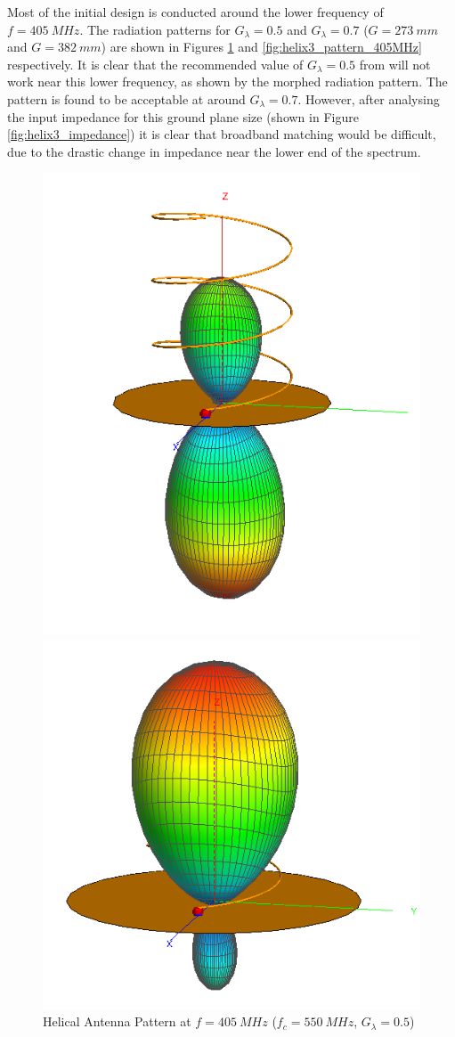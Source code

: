 Most of the initial design is conducted around the lower frequency of $f = \SI{405}{MHz}$. The radiation patterns for $G_\lambda = 0.5$ and $G_\lambda = 0.7$ ($G = \SI{273}{mm}$ and $G = \SI{382}{mm}$) are shown in Figures \ref{fig:helix2_pattern_405MHz} and \ref{fig:helix3_pattern_405MHz} respectively. It is clear that the recommended value of $G_\lambda = 0.5$ from \cite{textbook-antennaTheoryAnalysisDesign} will not work near this lower frequency, as shown by the morphed radiation pattern. The pattern is found to be acceptable at around $G_\lambda = 0.7$. However, after analysing the input impedance for this ground plane size (shown in Figure \ref{fig:helix3_impedance}) it is clear that broadband matching would be difficult, due to the drastic change in impedance near the lower end of the spectrum.

\begin{figure}[!htb]
  \begin{minipage}{.48\textwidth}
    \centering
    \includegraphics[width=0.6\linewidth]{helix2_pattern_405MHz}
    \caption{Helical Antenna Pattern at $f = \SI{405}{MHz}$ ($f_c = \SI{550}{MHz}$, $G_\lambda = 0.5$)}
    \label{fig:helix2_pattern_405MHz}
  \end{minipage}
  \begin{minipage}{.48\textwidth}
    \centering
    \includegraphics[width=0.75\linewidth]{helix3_pattern_405MHz}

\end{minipage}
\end{figure}
